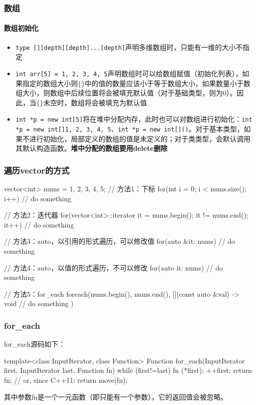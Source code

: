 \subsubsection{数组}
\paragraph{数组初始化}
\begin{itemize}
	\item \texttt{type [][depth][depth]...[depth]}声明多维数组时，只能有一维的大小不指定
	\item \texttt{int arr[5] = {1, 2, 3, 4, 5}}声明数组时可以给数组赋值（初始化列表），如果指定的数组大小则$\{\}$中的值的数量应该小于等于数组大小，如果数量小于数组大小，则数组中后续位置将会被填充默认值（对于基础类型，则为0）。因此，当$\{\}$未空时，数组将会被填充为默认值
	\item \texttt{int *p = new int[5]}将在堆中分配内存，此时也可以对数组进行初始化：\texttt{int *p = new int[]{1, 2, 3, 4, 5}}、\texttt{int *p = new int[]()}。对于基本类型，如果不进行初始化，局部定义的数组的值是未定义的；对于类类型，会默认调用其默认构造函数。\textbf{堆中分配的数组要用delete删除}
\end{itemize}

\subsubsection{遍历vector的方式}
\begin{cpp}
	vector<int> nums = {1, 2, 3, 4, 5};
	// 方法1：下标
	for(int i = 0; i < nums.size(); i++){
		// do something
	}
	
	// 方法2：迭代器
	for(vector<int>::iterator it = nums.begin(); it != nums.end(); it++){
		// do something
	}

	// 方法3：auto，以引用的形式遍历，可以修改值
	for(auto &it: nums){
		// do something 
	}

	// 方法4：auto，以值的形式遍历，不可以修改
	for(auto it: nums){
		// do something
	}
	
	// 方法5：for_each
	foreach(nums.begin(), nums.end(),
			[](const auto &val) -> void { 
				// do something
			})
	
\end{cpp}

\subsubsection{for\_each}
for\_each源码如下：
\begin{cpp}
	template<class InputIterator, class Function>
	Function for_each(InputIterator first, InputIterator last, Function fn)
	{
		while (first!=last) {
			fn (*first);
			++first;
		}
		return fn;      // or, since C++11: return move(fn);
	}
\end{cpp}
其中参数fn是一个一元函数（即只能有一个参数），它的返回值会被忽略。


